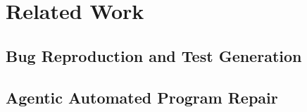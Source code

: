\section{Related Work}
\label{sec:related}

\subsection{Bug Reproduction and Test Generation}
\label{sec:related-brt}

\subsection{Agentic Automated Program Repair}
\label{sec:related-apr}

